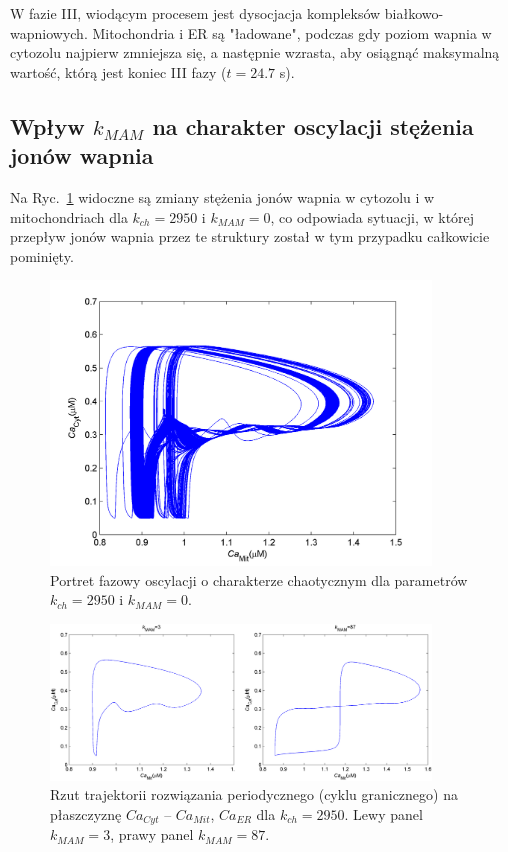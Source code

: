 W fazie III, wiodącym procesem jest dysocjacja kompleksów białkowo-wapniowych. Mitochondria i ER są "ładowane", podczas gdy poziom wapnia w cytozolu najpierw zmniejsza się, a następnie wzrasta, aby osiągnąć maksymalną wartość, którą jest koniec III fazy ($t = 24.7$ s). 

\FloatBarrier
\subsection{Wpływ $k_{MAM}$ na charakter oscylacji stężenia jonów wapnia}
\label{ss:oscChaotyczne}

Na Ryc.~\ref{fig:chaos_fazowyMo1} widoczne są zmiany stężenia jonów wapnia w cytozolu i w mitochondriach dla $k_{ch} = 2950$ i $k_{MAM} = 0$, co odpowiada sytuacji, w której przepływ jonów wapnia przez te struktury został w tym przypadku całkowicie pominięty. 

\begin{figure}[ht!]
\centering
\includegraphics[width=0.9\textwidth]{rysunki/rozdzial_5/marhl_chaos}
\caption[Oscylacje chaotyczne w Modelu \#1 - portret fazowy]{Portret fazowy oscylacji o charakterze chaotycznym dla parametrów $k_{ch} = 2950$ i $k_{MAM}=0$.}
\label{fig:chaos_fazowyMo1}
\end{figure}


\begin{figure}[ht!]
	\centering
	\includegraphics[width=0.9\textwidth]{rysunki/rozdzial_5/marhl_chaos_Kmam-3}
	\caption[Rzut trajektorii rozwiązania periodycznego]{Rzut trajektorii rozwiązania periodycznego (cyklu granicznego) na płaszczyznę $Ca_{Cyt}$ -- $Ca_{Mit}$, $Ca_{ER}$ dla $k_{ch}=2950$. Lewy panel $k_{MAM}=3$, prawy panel $k_{MAM}=87$.}
	\label{fig:marhlregularyzacja}
\end{figure}


